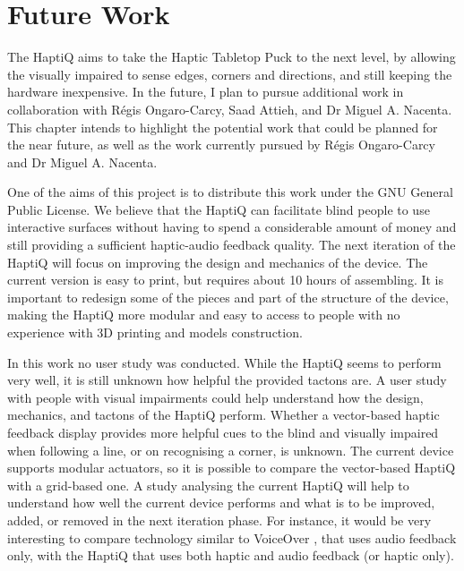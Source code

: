 \chapter{Future Work}
\label{chap:futureWork}

The HaptiQ aims to take the Haptic Tabletop Puck to the next level, by allowing the visually impaired to sense edges, corners and directions, and still keeping the hardware inexpensive. In the future, I plan to pursue additional work in collaboration with Régis Ongaro-Carcy, Saad Attieh, and Dr Miguel A. Nacenta. This chapter intends to highlight the potential work that could be planned for the near future, as well as the work currently pursued by Régis Ongaro-Carcy and Dr Miguel A. Nacenta. 

One of the aims of this project is to distribute this work under the GNU General Public License. We believe that the HaptiQ can facilitate blind people to use interactive surfaces without having to spend a considerable amount of money and still providing a sufficient haptic-audio feedback quality. 
The next iteration of the HaptiQ will focus on improving the design and mechanics of the device. The current version is easy to print, but requires about 10 hours of assembling. It is important to redesign some of the pieces and part of the structure of the device, making the HaptiQ more modular and easy to access to people with no experience with 3D printing and models construction. 

In this work no user study was conducted. While the HaptiQ seems to perform very well, it is still unknown how helpful the provided tactons are. A user study with people with visual impairments could help understand how the design, mechanics, and tactons of the HaptiQ perform. Whether a vector-based haptic feedback display provides more helpful cues to the blind and visually impaired when following a line, or on recognising a corner, is unknown. The current device supports modular actuators, so it is possible to compare the vector-based HaptiQ with a grid-based one. A study analysing the current HaptiQ will help to understand how well the current device performs and what is to be improved, added, or removed in the next iteration phase. For instance, it would be very interesting to compare technology similar to VoiceOver \cite{voiceOver}, that uses audio feedback only, with the HaptiQ that uses both haptic and audio feedback (or haptic only).  


